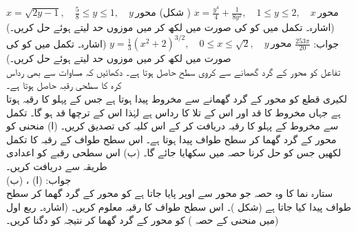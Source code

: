 $x=\sqrt{2y-1},\quad \tfrac{5}{8}\le y\le 1,\quad y\,\text{محور}$
\quad
(شکل )
$x=\tfrac{y^4}{4}+\tfrac{1}{8y^2},\quad 1\le y\le 2,\quad x\,\text{محور}$
\quad
(اشارہ۔ تکمل میں  کو  کی صورت میں لکھ کر  میں موزوں حد لیتے ہوئے حل کریں۔)\\
جواب:\quad
$\tfrac{253\pi}{20}$
$y=\tfrac{1}{3}(x^2+2)^{3/2},\quad 0\le x\le \sqrt{2},\quad y\,\text{محور}$
\quad
(اشارہ۔ تکمل میں  کو  کی صورت میں لکھ کر  میں موزوں حد لیتے ہوئے حل کریں۔)
\\
تفاعل  کو  محور کے گرد گھمانے سے کروی سطح حاصل ہوتا ہے۔ دکھائیں کہ مساوات  سے بھی رداس  کرہ کا سطحی رقبہ  حاصل ہوتا ہے۔
\\
لکیری قطع  کو  محور کے گرد گھمانے سے مخروط پیدا ہوتا ہے جس کے پہلو کا رقبہ  ہوتا ہے جہاں مخروط کا قد  اور اس کے تلا  کا رداس  ہے لہٰذا اس کے ترچھا قد  ہو گا۔ تکمل سے مخروط کے پہلو کا رقبہ دریافت کر کے اس کلیہ کی تصدیق کریں۔ 
   (ا) منحنی  کو  محور کے گرد گھما کر سطح طواف پیدا ہوتا ہے۔ اس سطح طواف کے رقبہ کا تکمل لکھیں جس کو حل کرنا حصہ  میں سکھایا جائے گا۔ (ب) اس سطحی رقبے کو اعدادی طریقہ سے دریافت کریں۔\\
جواب:\quad
(ا) ، (ب) 
\\
ستارہ نما  کا وہ حصہ جو  محور سے اوپر پایا جاتا ہے کو  محور کے گرد گھما کر سطح طواف پیدا کیا جاتا ہے (شکل )۔ اس سطح طواف کا رقبہ معلوم کریں۔ (اشارہ۔ ربع اول میں منحنی کے حصہ ) کو  محور کے گرد گھما کر نتیجہ  کو دگنا کریں۔)
